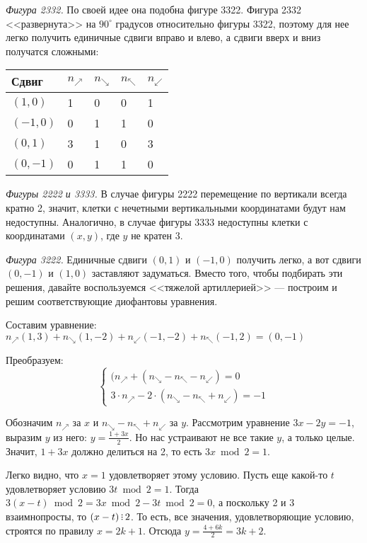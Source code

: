 \begin{itemize}
\emph{Фигура 2332.} По своей идее она подобна фигуре 3322. Фигура 2332 <<развернута>> на $90^\circ$ 
градусов относительно фигуры 3322, поэтому для нее легко получить единичные сдвиги вправо и влево, а сдвиги 
вверх и вниз получатся сложными:

\begin{center}\begin{tabular}{lllll}
Сдвиг & $n_\nearrow$ & $n_\searrow$ & $n_\nwarrow$ & $n_\swarrow$ \\
\hline
$(1,0)$ & 1 & 0 & 0 & 1\\
$(-1,0)$ & 0 & 1 & 1 & 0\\
$(0,1)$ & 3 & 1 & 0 & 3\\
$(0,-1)$ & 0 & 1 & 1 & 0
\end{tabular}\end{center}

\emph{Фигуры 2222 и 3333.} В случае фигуры 2222 перемещение по вертикали всегда кратно 2, значит, клетки с 
нечетными вертикальными координатами будут нам недоступны. Аналогично, в случае фигуры 3333 недоступны
клетки с координатами $(x,y)$, где $y$ не кратен 3.

\emph{Фигура 3222.} Единичные сдвиги $(0,1)$ и $(-1,0)$ получить легко, а вот сдвиги $(0,-1)$ и $(1,0)$ заставляют 
задуматься. Вместо того, чтобы подбирать эти решения, давайте воспользуемся <<тяжелой артиллерией>> ---
построим и решим соответствующие диофантовы уравнения.

Составим уравнение:
$n_\nearrow(1,3) + n_\searrow(1,-2) + n_\swarrow(-1,-2) + n_\nwarrow(-1,2) = (0,-1)$

Преобразуем:
$$\left\{\begin{array}{l}
  (n_\nearrow + (n_\searrow - n_\nwarrow - n_\swarrow) = 0\\
  3\cdot n_\nearrow - 2\cdot(n_\searrow - n_\nwarrow + n_\swarrow)=-1
\end{array}\right.$$

Обозначим $n_\nearrow$ за $x$ и $n_\searrow - n_\nwarrow + n_\swarrow$ за $y$.
Рассмотрим уравнение $3x - 2y = -1$, выразим $y$ из него: $y = \frac{1 + 3x}{2}$. 
Но нас устраивают не все такие $y$, а только целые. Значит, $1+3x$ должно делиться на 2, 
то есть $3x \bmod 2 = 1$. 

Легко видно, что $x=1$ удовлетворяет этому условию. Пусть еще какой-то $t$ удовлетворяет
условию $3t \bmod 2 = 1$. Тогда $3(x-t) \bmod 2 = 3x \bmod 2 - 3t \bmod 2 = 0$,
а поскольку 2 и 3 взаимнопросты, то $(x-t) \divsby 2$.
То есть, все значения, удовлетворяющие условию, строятся по правилу $x = 2k + 1$.
Отсюда $y = \frac{4 + 6k}{2} = 3k + 2$.


\end{itemize}
